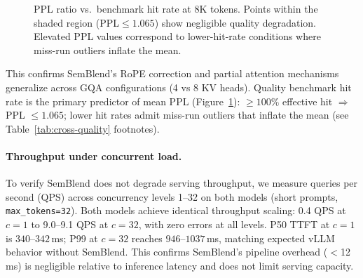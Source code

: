 \documentclass[10pt,twocolumn]{article}
\begin{document}
\begin{figure}[t]
\centering
{}
\caption{PPL ratio vs.\ benchmark hit rate at 8K tokens.
Points within the shaded region (PPL${\leq}1.065$) show negligible quality
degradation. Elevated PPL values correspond to lower-hit-rate conditions
where miss-run outliers inflate the mean.}
\label{fig:ppl-scatter}
\end{figure}

This confirms SemBlend's RoPE correction and partial attention mechanisms
generalize across GQA configurations (4 vs 8 KV heads).
Quality benchmark hit rate is the primary predictor of mean PPL
(Figure~\ref{fig:ppl-scatter}):
${\geq}100\%$ effective hit $\Rightarrow$ PPL ${\leq}1.065$;
lower hit rates admit miss-run outliers that inflate the mean
(see Table~\ref{tab:cross-quality} footnotes).

\paragraph{Throughput under concurrent load.}
To verify SemBlend does not degrade serving throughput, we measure
queries per second (QPS) across concurrency levels 1--32 on both models
(short prompts, \texttt{max\_tokens=32}). Both models achieve identical
throughput scaling: 0.4 QPS at $c{=}1$ to 9.0--9.1 QPS at $c{=}32$,
with zero errors at all levels. P50 TTFT at $c{=}1$ is $340$--$342$\,ms; P99 at $c{=}32$
reaches $946$--$1037$\,ms, matching expected vLLM behavior
without SemBlend. This confirms SemBlend's pipeline overhead
($<$12\,ms) is negligible relative to inference latency and does not
limit serving capacity.
\end{document}
